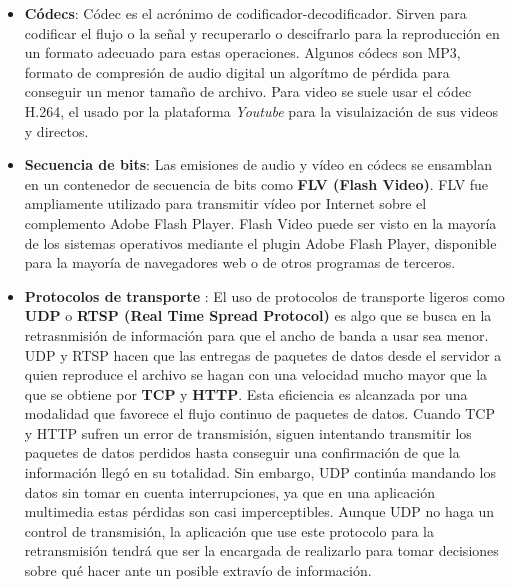 \begin{itemize}
\item \textbf{C\'odecs}: C\'odec es el acr\'onimo de codificador-decodificador. Sirven para codificar el flujo o la se\~nal y recuperarlo o descifrarlo para la reproducci\'on en un formato adecuado para estas operaciones. Algunos c\'odecs son MP3, formato de compresi\'on de audio digital un algor\'itmo de p\'erdida para conseguir un menor tama\~no de archivo. Para video se suele usar el c\'odec H.264, el usado por la plataforma \textit{Youtube} para la visulaizaci\'on de sus videos y directos.
\item \textbf{Secuencia de bits}: Las emisiones de audio y v\'ideo en c\'odecs se ensamblan en un contenedor de secuencia de bits como \textbf{FLV (Flash Video)}. FLV fue ampliamente utilizado para transmitir v\'ideo por Internet sobre el complemento Adobe Flash Player. Flash Video puede ser visto en la mayor\'ia de los sistemas operativos mediante el plugin Adobe Flash Player, disponible para la mayor\'ia de navegadores web o de otros programas de terceros.
\item \textbf{Protocolos de transporte} : El uso de protocolos de transporte ligeros como \textbf{UDP} o \textbf{RTSP (Real Time Spread Protocol)} es algo que se busca en la retrasnmisi\'on de informaci\'on para que el ancho de banda a usar sea menor. UDP y RTSP hacen que las entregas de paquetes de datos desde el servidor a quien reproduce el archivo se hagan con una velocidad mucho mayor que la que se obtiene por \textbf{TCP} y \textbf{HTTP}. Esta eficiencia es alcanzada por una modalidad que favorece el flujo continuo de paquetes de datos. Cuando TCP y HTTP sufren un error de transmisi\'on, siguen intentando transmitir los paquetes de datos perdidos hasta conseguir una confirmaci\'on de que la informaci\'on lleg\'o en su totalidad. Sin embargo, UDP contin\'ua mandando los datos sin tomar en cuenta interrupciones, ya que en una aplicaci\'on multimedia estas p\'erdidas son casi imperceptibles. Aunque UDP no haga un control de transmisi\'on, la aplicaci\'on que use este protocolo para la retransmisi\'on tendr\'a que ser la encargada de realizarlo para tomar decisiones sobre qu\'e hacer ante un posible extrav\'io de informaci\'on.

\end{itemize}
